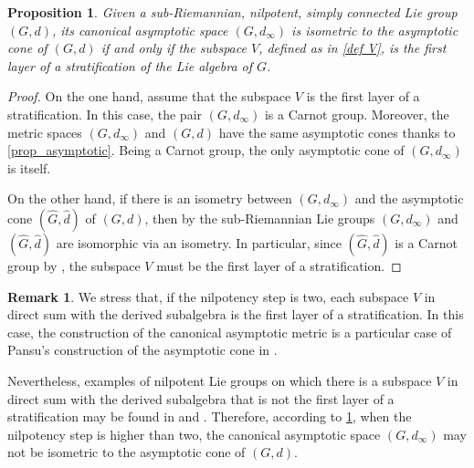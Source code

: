 \documentclass[a4paper,11pt,reqno]{amsart}
\theoremstyle{plain}
\newtheorem{proposition}[theorem]{Proposition}
\theoremstyle{definition}
\newtheorem{remark}[theorem]{Remark}
\newcommand{\g}{\mathfrak{g}}
\begin{document}
 \begin{proposition}\label{pansu}
 Given a sub-Riemannian, nilpotent, simply connected Lie group $(G,d)$, its canonical asymptotic space $(G,d_\infty)$ is isometric to the asymptotic cone of $(G,d)$ if and only if the subspace $V$, defined as in \eqref{def V}, is the first layer of a stratification of the Lie algebra of $G$. 
 \end{proposition}
\begin{proof}
On the one hand, assume that the subspace $V$ is the first layer of a stratification. In this case, the pair $(G, d_\infty)$ is a Carnot group. Moreover, the metric spaces $(G, d_\infty)$ and $(G,d)$ have the same asymptotic cones thanks to \cref{prop_asymptotic}. Being a Carnot group, the only asymptotic cone of $(G, d_\infty)$ is itself.

On the other hand, if there is an isometry between $(G,d_\infty)$ and the asymptotic cone $(\hat G,\hat d)$ of $(G,d)$, then by \cite{MR3646026} the sub-Riemannian Lie groups $(G,d_\infty)$ and $(\hat G, \hat d)$ are isomorphic via an isometry. In particular, since $(\hat G, \hat d)$ is a Carnot group by \cite{MR741395}, the subspace $V$ must be the first layer of a stratification.
\end{proof}
 \begin{remark} We stress that, if the nilpotency step is two, each subspace $V$ in direct sum with the derived subalgebra is the first layer of a stratification. In this case, the construction of the canonical asymptotic metric is a particular case of Pansu's construction of the asymptotic cone in \cite{MR741395}.

 Nevertheless, examples of nilpotent Lie groups on which there is a subspace $V$ in direct sum with the derived subalgebra that is not the first layer of a stratification may be found in \cite{MR3793294, MR4490195} and \cite[Exercise~9.5.28]{donne2024metricliegroupscarnotcaratheodory}. Therefore, according to \cref{pansu}, when the nilpotency step is higher than two, the canonical asymptotic space $(G,d_\infty)$ may not be isometric to the asymptotic cone of $(G,d)$. 
 \end{remark}
\end{document}
